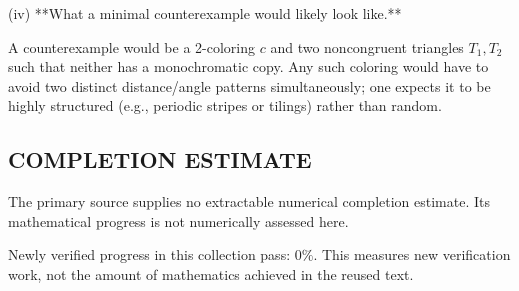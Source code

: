 (iv) **What a minimal counterexample would likely look like.**

A counterexample would be a 2-coloring $c$ and two noncongruent triangles $T_1,T_2$ such that neither has a monochromatic copy. Any such coloring would have to avoid two distinct distance/angle patterns simultaneously; one expects it to be highly structured (e.g., periodic stripes or tilings) rather than random.




\subsection*{COMPLETION ESTIMATE}
The primary source supplies no extractable numerical completion estimate. Its mathematical progress is not numerically assessed here.

Newly verified progress in this collection pass: $0\%$. This measures new verification work, not the amount of mathematics achieved in the reused text.
